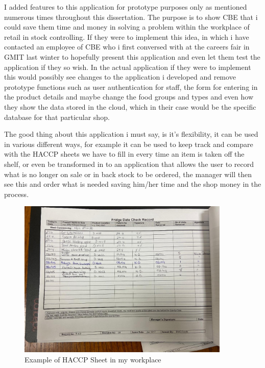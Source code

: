 I added features to this application for prototype purposes only as mentioned numerous times throughout this dissertation. The purpose is to show CBE that i could save them time and money in solving a problem within the workplace of retail in stock controlling. If they were to implement this idea, in which i have contacted an employee of CBE who i first conversed with at the careers fair in GMIT last winter to hopefully present this application and even let them test the application if they so wish. In the actual application if they were to implement this would possibly see changes to the application i developed and remove prototype functions such as user authentication for staff, the form for entering in the product details and maybe change the food groups and types and even how they show the data stored in the cloud, which in their case would be the specific database for that particular shop. 
\newline 

\newpage
The good thing about this application i must say, is it's flexibility, it can be used in various different ways, for example it can be used to keep track and compare with the HACCP sheets we have to fill in every time an item is taken off the shelf, or even be transformed in to an application that allows the user to record what is no longer on sale or in back stock to be ordered, the manager will then see this and order what is needed saving him/her time and the shop money in the process.

\begin{figure}[h!]
	\caption{Example of HACCP Sheet in my workplace}
	\label{image:HACCP}
	\centering
	\includegraphics[width=0.9\textwidth]{images/HACCP.jpg}
\end{figure}

